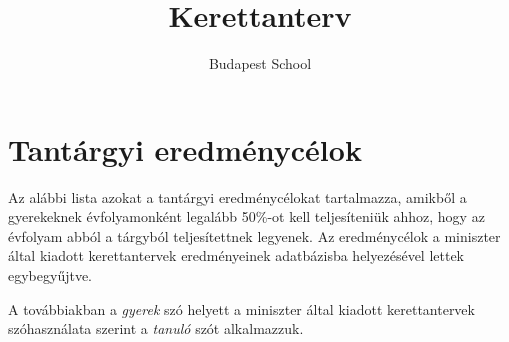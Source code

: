 \documentclass[magyar,12pt,a4paper,oneside,draf]{report}
\begin{document}
\title{Kerettanterv}
\author{Budapest School}

\maketitle

\tableofcontents
\newpage






{}
\label{sec:bibliographyk}


\chapter{Tantárgyi eredménycélok}
\label{sec:tantargyi_celok}
Az alábbi lista azokat a tantárgyi eredménycélokat tartalmazza, amikből a gyerekeknek évfolyamonként legalább 50\%-ot kell teljesíteniük ahhoz, hogy az évfolyam abból a tárgyból teljesítettnek legyenek. Az eredménycélok a miniszter által kiadott kerettantervek\cite{ofi:kerettanterv}  eredményeinek adatbázisba helyezésével lettek egybegyűjtve.

A továbbiakban a \emph{gyerek} szó helyett a miniszter által kiadott kerettantervek szóhasználata szerint a \emph{tanuló} szót alkalmazzuk.


\end{document}
